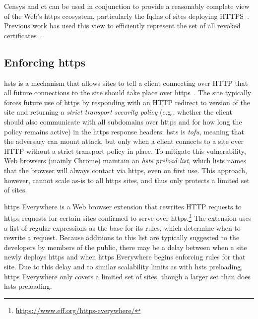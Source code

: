 Censys and \ac{ct} can be used in conjunction to provide a reasonably complete
view of the Web's \ac{https} ecosystem, particularly the \acp{fqdn} of sites
deploying HTTPS~\cite{vandersloot2016towards}. Previous work has used this view
to efficiently represent the set of all revoked
certificates~\cite{larisch2017crlite}.

\subsection{Enforcing \ac{https}}

\ac{hsts} is a mechanism that allows sites to tell a client connecting over HTTP
that all future connections to the site should take place over
\ac{https}~\cite{rfc6797}. The site typically forces future use of \ac{https} by
responding with an HTTP redirect to  version of the site and
returning a \emph{strict transport security policy} (e.g., whether the client
should also communicate with all subdomains over \ac{https} and for how long the
policy remains active) in the \ac{https} response headers. \ac{hsts} is
\emph{\ac{tofu}}, meaning that the adversary can mount  attack, but
only when a client connects to a site over HTTP without a strict transport
policy in place. To mitigate this vulnerability, Web browsers (mainly Chrome)
maintain an \emph{\ac{hsts} preload list}, which lists names that the
browser will always contact via \ac{https}, even on first use. This approach,
however, cannot scale as-is to all \ac{https} sites, and thus only protects a
limited set of sites.

\ac{https} Everywhere is a Web browser extension that rewrites HTTP requests to
\ac{https} requests for certain sites confirmed to serve over
\ac{https}.\footnote{\url{https://www.eff.org/https-everywhere/}} The extension
uses a list of regular expressions as the base for its rules, which determine
when to rewrite a request. Because additions to this list are typically
suggested to the developers by members of the public, there may be a delay
between when a site newly deploys \ac{https} and when \ac{https} Everywhere
begins enforcing rules for that site. Due to this delay and to similar
scalability limits as with \ac{hsts} preloading, \ac{https} Everywhere only
covers a limited set of sites, though a larger set than does
\ac{hsts} preloading.

